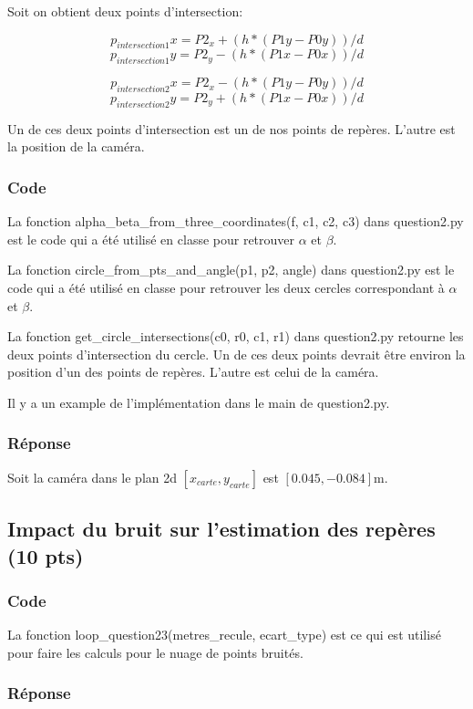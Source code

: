 \documentclass[12pt]{article}
\begin{document}
Soit on obtient deux points d'intersection:

\[  p_{intersection1}x = P2_x + (h*(P1y - P0y))/d \]
\[  p_{intersection1}y = P2_y - (h*(P1x - P0x))/d \]

\[  p_{intersection2}x = P2_x - (h*(P1y - P0y))/d \]
\[  p_{intersection2}y = P2_y + (h*(P1x - P0x))/d \]

Un de ces deux points d'intersection est un de nos points de rep\`eres.
L'autre est la position de la cam\'era.

\subsubsection{Code}
La fonction alpha\_beta\_from\_three\_coordinates(f, c1, c2, c3) dans question2.py est le code qui a été utilisé en classe pour retrouver $\alpha$ et $\beta$.

La fonction circle\_from\_pts\_and\_angle(p1, p2, angle) dans question2.py est le code qui a été utilisé en classe pour retrouver les deux cercles correspondant \`a $\alpha$ et $\beta$.

La fonction get\_circle\_intersections(c0, r0, c1, r1) dans question2.py retourne les deux points d'intersection du cercle.
Un de ces deux points devrait \^etre environ la position d'un des points de rep\`eres.
L'autre est celui de la cam\'era.

Il y a un example de l'impl\'ementation dans le main de question2.py.

\subsubsection{Réponse}
Soit la caméra dans le plan 2d $ [x_{carte}, y_{carte}]$ est $[0.045, -0.084]$m. 

\subsection{Impact du bruit sur l'estimation des repères (10 pts)}
\subsubsection{Code}
La fonction loop\_question23(metres\_recule, ecart\_type) est ce qui est utilis\'e pour faire les calculs pour le nuage de points bruit\'es.

\subsubsection{Réponse}
\end{document}

